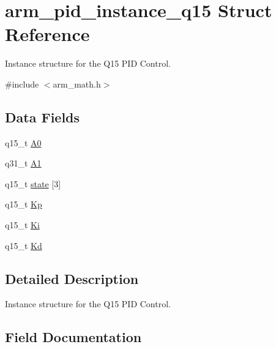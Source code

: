 \hypertarget{structarm__pid__instance__q15}{}\section{arm\+\_\+pid\+\_\+instance\+\_\+q15 Struct Reference}
\label{structarm__pid__instance__q15}


Instance structure for the Q15 P\+ID Control.  




{\ttfamily \#include $<$arm\+\_\+math.\+h$>$}

\subsection*{Data Fields}
\begin{DoxyCompactItemize}
\item 
q15\+\_\+t \hyperlink{structarm__pid__instance__q15_a1aa73268c65cea0c7bc66bb70ff35205}{A0}
\item 
q31\+\_\+t \hyperlink{structarm__pid__instance__q15_aeb897c84724b56948e4222aca8d0e1f4}{A1}
\item 
q15\+\_\+t \hyperlink{structarm__pid__instance__q15_a4c4e19d77015f5f7a31a1daf0faf31b6}{state} \mbox{[}3\mbox{]}
\item 
q15\+\_\+t \hyperlink{structarm__pid__instance__q15_afef61fb3b64c73f2cd0c91d9dcf95679}{Kp}
\item 
q15\+\_\+t \hyperlink{structarm__pid__instance__q15_a19d5059baf06dd52266260d096702d0a}{Ki}
\item 
q15\+\_\+t \hyperlink{structarm__pid__instance__q15_abf38d18de1e16bc6d86846fedf8534fe}{Kd}
\end{DoxyCompactItemize}


\subsection{Detailed Description}
Instance structure for the Q15 P\+ID Control. 

\subsection{Field Documentation}
\mbox{\label{structarm__pid__instance__q15_a1aa73268c65cea0c7bc66bb70ff35205}} 
